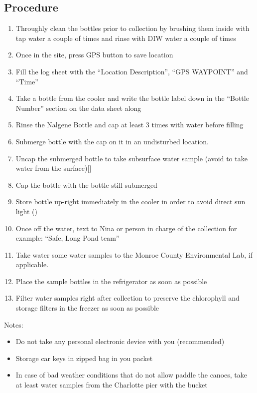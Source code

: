 \begin{appendices}
\subsection{Procedure}
\begin{enumerate}
  \item Throughly clean the bottles prior to collection by brushing them inside with tap water a couple of times and rinse with DIW water a couple of times
  \item Once in the site, press GPS button to save location
  \item Fill the log sheet with the ``Location Description'', ``GPS WAYPOINT'' and ``Time''
  \item Take a bottle from the cooler and write the bottle label down in the ``Bottle Number'' section on the data sheet along
  \item Rinse the Nalgene Bottle and cap at least 3 times with water before filling
  \item Submerge bottle with the cap on it in an undisturbed location.
  \item Uncap the submerged bottle  to take subsurface water sample (avoid to take water from the surface)[\cite{Montana08}]
  \item Cap the bottle with the bottle still submerged
  \item Store bottle up-right immediately in the cooler in order to avoid direct sun light (\cite{Mueller1995})
  \item Once off the water, text to Nina or person in charge of the collection for example: ``Safe, Long Pond team''
  \item Take water some water samples to the Monroe County Environmental Lab, if applicable.
  \item Place the sample bottles in the refrigerator as soon as possible
  \item Filter water samples right after collection to preserve the chlorophyll and storage filters in the freezer as soon as possible
\end{enumerate}
Notes: 
\begin{itemize}
  \item Do not take any personal electronic device with you (recommended)
  \item Storage car keys in zipped bag in you packet
  \item In case of bad weather conditions that do not allow paddle the canoes, take at least water samples from the Charlotte pier with the bucket
\end{itemize}


\end{appendices}
